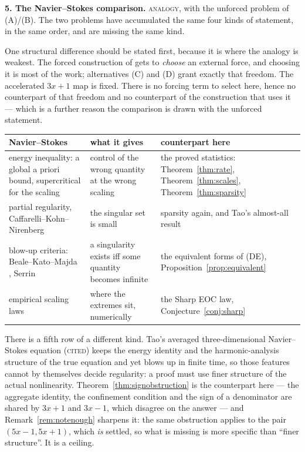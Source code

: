 \documentclass[11pt,reqno]{amsart}
\theoremstyle{plain}
\theoremstyle{definition}
\newcommand{\lab}[1]{\textnormal{\textsc{\small #1}}}
\begin{document}
\medskip
\noindent\textbf{5. The Navier--Stokes comparison.} \lab{analogy}, with the
unforced problem of \textup{(A)}/\textup{(B)}. The two problems have accumulated
the same four kinds of statement, in the same order, and are missing the same kind.

One structural difference should be stated first, because it is where the analogy
is weakest. The forced construction of \cite{OpenAINS2026} gets to \emph{choose}
an external force, and choosing it is most of the work; alternatives \textup{(C)}
and \textup{(D)} grant exactly that freedom. The accelerated $3x+1$ map is fixed.
There is no forcing term to select here, hence no counterpart of that freedom and
no counterpart of the construction that uses it --- which is a further reason the
comparison is drawn with the unforced statement.

\begin{center}\small
\begin{tabular}{@{}p{}p{}p{}@{}}
\toprule
Navier--Stokes & what it gives & counterpart here\\
\midrule
energy inequality: a global a priori bound, supercritical for the scaling
& control of the wrong quantity at the wrong scaling
& the proved statistics: Theorem~\ref{thm:rate}, Theorem~\ref{thm:scales},
Theorem~\ref{thm:sparsity}\\[3pt]
partial regularity, Caffarelli--Kohn--Nirenberg \cite{CaffarelliKohnNirenberg1982}
& the singular set is small
& sparsity again, and Tao's almost-all result \cite{Tao2022}\\[3pt]
blow-up criteria: Beale--Kato--Majda \cite{BealeKatoMajda1984}, Serrin
\cite{Serrin1962}
& a singularity exists iff some quantity becomes infinite
& the equivalent forms of \textup{(DE)}, Proposition~\ref{prop:equivalent}\\[3pt]
empirical scaling laws
& where the extremes sit, numerically
& the Sharp EOC law, Conjecture~\ref{conj:sharp}\\
\bottomrule
\end{tabular}
\end{center}

There is a fifth row of a different kind. Tao's averaged three-dimensional
Navier--Stokes equation \cite{TaoAveragedNS2016} (\lab{cited}) keeps the energy
identity and the harmonic-analysis structure of the true equation and yet blows up
in finite time, so those features cannot by themselves decide regularity: a proof
must use finer structure of the actual nonlinearity.
Theorem~\ref{thm:signobstruction} is the counterpart here --- the aggregate
identity, the confinement condition and the sign of a denominator are shared by
$3x+1$ and $3x-1$, which disagree on the answer --- and Remark~\ref{rem:notenough}
sharpens it: the same obstruction applies to the pair $(5x-1,5x+1)$, which
\emph{is} settled, so what is missing is more specific than ``finer structure''.
It is a ceiling.
\end{document}
